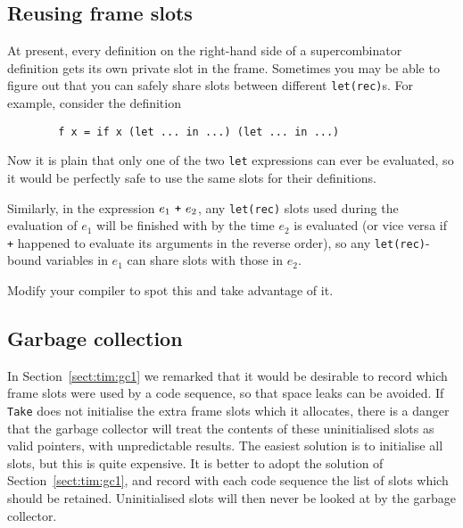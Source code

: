 \subsection{Reusing frame slots\advanced}

At present, every definition on the right-hand side of a supercombinator
definition gets its own private slot in the frame.
Sometimes you may be able to figure out that you can safely share
slots between different \mbox{\tt let(rec)}s.
For example, consider the definition
\begin{verbatim}
        f x = if x (let ... in ...) (let ... in ...)
\end{verbatim}
Now it is plain that only one of the two \mbox{\tt let} expressions can ever be
evaluated, so it would be perfectly safe to use the same slots for their
definitions.

Similarly, in the expression $e_1~ \mbox{\tt +}~ e_2$, any \mbox{\tt let(rec)} slots used
during the evaluation of $e_1$ will be finished with by the time $e_2$
is evaluated (or vice versa if \mbox{\tt +} happened to evaluate its arguments in
the reverse order), so any \mbox{\tt let(rec)}-bound variables in $e_1$ can share
slots with those in $e_2$.

\begin{exercise}
Modify your compiler to spot this and take advantage of it.
\end{exercise}

\subsection{Garbage collection\advanced}
\label{sect:tim:gc2}

In Section~\ref{sect:tim:gc1} we remarked that it would be desirable to
record which frame slots were used by a code sequence, so that space leaks
can be avoided.
If \mbox{\tt Take} does not initialise the extra frame slots which it allocates,
there is a danger that the garbage collector will treat the contents
of these uninitialised slots as valid pointers, with unpredictable results.
The easiest solution is to initialise all slots, but this is quite expensive.
It is better to adopt the solution of Section~\ref{sect:tim:gc1}, and
record with each code sequence the list of slots which should be retained.
Uninitialised slots will then never be looked at by the garbage collector.

